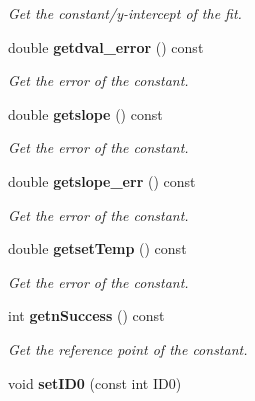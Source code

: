 \begin{DoxyCompactItemize}
\begin{DoxyCompactList}\small\item\em Get the constant/y-\/intercept of the fit. \item\end{DoxyCompactList}\item 
double {\bf getdval\_\-error} () const \label{classCALICE_1_1ScECALGainfit_a477f830e6432cf59df7c29dfa723599f}

\begin{DoxyCompactList}\small\item\em Get the error of the constant. \item\end{DoxyCompactList}\item 
double {\bf getslope} () const \label{classCALICE_1_1ScECALGainfit_acfacde2820945334b9dc3d2f71082995}

\begin{DoxyCompactList}\small\item\em Get the error of the constant. \item\end{DoxyCompactList}\item 
double {\bf getslope\_\-err} () const \label{classCALICE_1_1ScECALGainfit_a3ecd7fde37dab4825939e63bed01a64e}

\begin{DoxyCompactList}\small\item\em Get the error of the constant. \item\end{DoxyCompactList}\item 
double {\bf getsetTemp} () const \label{classCALICE_1_1ScECALGainfit_a956008d4cf21859099fa90b4669b7fa0}

\begin{DoxyCompactList}\small\item\em Get the error of the constant. \item\end{DoxyCompactList}\item 
int {\bf getnSuccess} () const \label{classCALICE_1_1ScECALGainfit_a9174f6151eaffaa52f638593fca922f5}

\begin{DoxyCompactList}\small\item\em Get the reference point of the constant. \item\end{DoxyCompactList}\item 
void {\bf setID0} (const int ID0)\label{classCALICE_1_1ScECALGainfit_a77d93fb1baa6a91c0377079101249849}


\end{DoxyCompactItemize}
